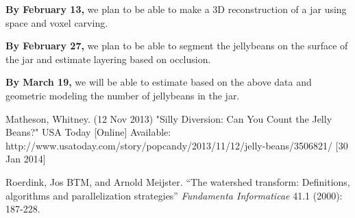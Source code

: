 \documentclass{article}
\begin{document}
\textbf{By February 13,} we plan to be able to make a 3D reconstruction of a jar using space and voxel carving.

\textbf{By February 27,} we plan to be able to segment the jellybeans on the surface of the jar and estimate layering based on occlusion.

\textbf{By March 19,} we will be able to estimate based on the above data and geometric modeling the number of jellybeans in the jar. 

\begin{thebibliography}{9}

	Matheson, Whitney. (12 Nov 2013) "Silly Diversion: Can You Count the Jelly Beans?" USA Today 		[Online] Available: http://www.usatoday.com/story/popcandy/2013/11/12/jelly-beans/3506821/ [30 Jan 2014]
	
Roerdink, Jos BTM, and Arnold Meijster. ``The watershed transform: Definitions, algorithms and parallelization strategies'' \emph{Fundamenta Informaticae} 41.1 (2000): 187-228.

\end{thebibliography}
\end{document}
